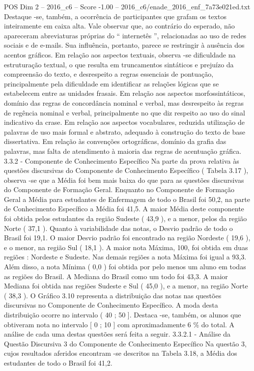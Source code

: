 \begin{textsample}{POS Dim 2 – 2016\_c6 – Score -1.00 – 2016\_c6/enade\_2016\_enf\_7a73e021ed.txt}
Destaque -se, também, a ocorrência de participantes que grafam os textos inteiramente em caixa alta.
Vale observar que, ao contrário do esperado, não apareceram abreviaturas próprias do “ internetês ”, relacionadas ao uso de redes sociais e de e-mails.
Sua influência, portanto, parece se restringir à ausência dos acentos gráficos.
Em relação aos aspectos textuais, observa -se dificuldade na estruturação textual, o que resulta em truncamentos sintáticos e prejuízo da compreensão do texto, e desrespeito a regras essenciais de pontuação, principalmente pela dificuldade em identificar as relações lógicas que se estabelecem entre as unidades frasais.
Em relação aos aspectos morfossintáticos, domínio das regras de concordância nominal e verbal, mas desrespeito às regras de regência nominal e verbal, principalmente no que diz respeito ao uso do sinal indicativo da crase.
Em relação aos aspectos vocabulares, reduzida utilização de palavras de uso mais formal e abstrato, adequado à construção do texto de base dissertativa.
Em relação às convenções ortográficas, domínio da grafia das palavras, mas falta de atendimento à maioria das regras de acentuação gráfica. 3.3.2 - Componente de Conhecimento Específico Na parte da prova relativa às questões discursivas do Componente de Conhecimento Específico ( Tabela 3.17 ), observa -se que a Média foi bem mais baixa do que para as questões discursivas do Componente de Formação Geral.
Enquanto no Componente de Formação Geral a Média para estudantes de Enfermagem de todo o Brasil foi 50,2, na parte de Conhecimento Específico a Média foi 41,5.
A maior Média deste componente foi obtida pelos estudantes da região Sudeste ( 43,9 ), e a menor, pelos da região Norte ( 37,1 ).
Quanto à variabilidade das notas, o Desvio padrão de todo o Brasil foi 19,1.
O maior Desvio padrão foi encontrado na região Nordeste ( 19,6 ), e o menor, na região Sul ( 18,1 ).
A maior nota Máxima, 100, foi obtida em duas regiões : Nordeste e Sudeste.
Nas demais regiões a nota Máxima foi igual a 93,3.
Além disso, a nota Mínima ( 0,0 ) foi obtida por pelo menos um aluno em todas as regiões do Brasil.
A Mediana do Brasil como um todo foi 43,3.
A maior Mediana foi obtida nas regiões Sudeste e Sul ( 45,0 ), e a menor, na região Norte ( 38,3 ).
O Gráfico 3.10 representa a distribuição das notas nas questões discursivas no Componente de Conhecimento Específico.
A moda desta distribuição ocorre no intervalo ( 40 ; 50 ].
Destaca -se, também, os alunos que obtiveram nota no intervalo [ 0 ; 10 ] com aproximadamente 6 \% do total.
A análise de cada uma destas questões será feita a seguir. 3.3.2.1 - Análise da Questão Discursiva 3 do Componente de Conhecimento Específico Na questão 3, cujos resultados aferidos encontram -se descritos na Tabela 3.18, a Média dos estudantes de todo o Brasil foi 41,2.

\end{textsample}
